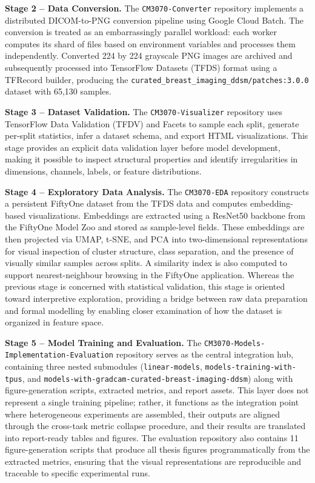 \documentclass[justified,notoc,openany]{tufte-book}
\begin{document}
\textbf{Stage 2 -- Data Conversion.} The \texttt{CM3070-Converter} repository implements a distributed DICOM-to-PNG conversion pipeline using Google Cloud Batch. The conversion is treated as an embarrassingly parallel workload: each worker computes its shard of files based on environment variables and processes them independently. Converted 224 by 224 grayscale PNG images are archived and subsequently processed into TensorFlow Datasets (TFDS) format using a TFRecord builder, producing the \texttt{curated\_breast\_imaging\_ddsm/patches:3.0.0} dataset with 65,130 samples.

\textbf{Stage 3 -- Dataset Validation.} The \texttt{CM3070-Visualizer} repository uses TensorFlow Data Validation (TFDV) and Facets to sample each split, generate per-split statistics, infer a dataset schema, and export HTML visualizations. This stage provides an explicit data validation layer before model development, making it possible to inspect structural properties and identify irregularities in dimensions, channels, labels, or feature distributions.

\textbf{Stage 4 -- Exploratory Data Analysis.} The \texttt{CM3070-EDA} repository constructs a persistent FiftyOne dataset from the TFDS data and computes embedding-based visualizations. Embeddings are extracted using a ResNet50 backbone from the FiftyOne Model Zoo and stored as sample-level fields. These embeddings are then projected via UMAP, t-SNE, and PCA into two-dimensional representations for visual inspection of cluster structure, class separation, and the presence of visually similar samples across splits. A similarity index is also computed to support nearest-neighbour browsing in the FiftyOne application. Whereas the previous stage is concerned with statistical validation, this stage is oriented toward interpretive exploration, providing a bridge between raw data preparation and formal modelling by enabling closer examination of how the dataset is organized in feature space.

\textbf{Stage 5 -- Model Training and Evaluation.} The \texttt{CM3070-Models-Implementation-Evaluation} repository serves as the central integration hub, containing three nested submodules (\texttt{linear-models}, \texttt{models-training-with-tpus}, and \texttt{models-with-gradcam-curated-breast-imaging-ddsm}) along with figure-generation scripts, extracted metrics, and report assets. This layer does not represent a single training pipeline; rather, it functions as the integration point where heterogeneous experiments are assembled, their outputs are aligned through the cross-task metric collapse procedure, and their results are translated into report-ready tables and figures. The evaluation repository also contains 11 figure-generation scripts that produce all thesis figures programmatically from the extracted metrics, ensuring that the visual representations are reproducible and traceable to specific experimental runs.
\end{document}
